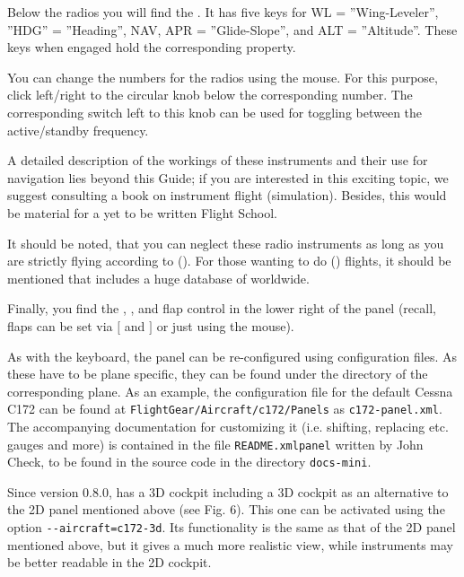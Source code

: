 Below the radios you will find the . It has five keys for WL = ''Wing-Leveler'', ''HDG'' = ''Heading'', NAV, APR = ''Glide-Slope'', and ALT = ''Altitude''. These keys when engaged hold the corresponding property. 

You can change the numbers for the radios using the mouse. For this purpose, click left/right to the circular knob below the corresponding number. The corresponding switch left to this knob can be used for toggling between the active/standby frequency.

A detailed description of the workings of these instruments and their use for navigation
lies beyond this Guide; if you are interested in this exciting topic, we suggest
consulting a book on instrument flight (simulation). Besides, this would be material for
a yet to be written \FlightGear{} Flight School. 

It should be noted, that you can neglect these radio instruments as long as you are strictly flying according to  (). For those wanting to do  () flights, it should be mentioned that \FlightGear{} includes a huge database of  worldwide.

Finally, you find the , , and flap control in
the lower right of the panel (recall, flaps can be set via $[$ and $]$ or just using the mouse).

As with the keyboard, the panel can be re-configured using
configuration files. As these have to be plane specific, they can be found under the
directory of the corresponding plane. As an example, the configuration file for the
default Cessna C172 can be found at \texttt{FlightGear/Aircraft/c172/Panels} as
\texttt{c172-panel.xml}. The accompanying documentation for customizing it (i.e. shifting,
replacing etc. gauges and more) is contained in the file \texttt{README.xmlpanel} written by John Check,
to be found in the source code in the directory \texttt{docs-mini}.

Since version 0.8.0, \FlightGear{} has a 3D cockpit including a 3D cockpit as an alternative to the 2D panel mentioned above (see Fig. 6). This one can be activated using the option \texttt{-$ $-aircraft=c172-3d}. Its functionality is the same as that of the 2D panel mentioned above, but it gives a much more realistic view, while instruments may be better readable in the 2D cockpit.
\medskip

